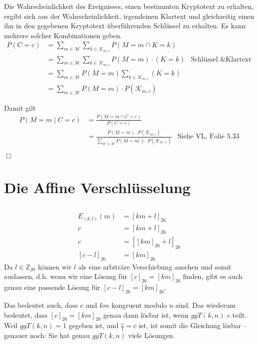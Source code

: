 \documentclass{../crypto}
\begin{document}
Die Wahrscheinlichkeit des Ereignisses, einen bestimmten Kryptotext zu erhalten,
ergibt sich aus der Wahrscheinlichkeit, irgendeinen Klartext und gleichzeitig
einen ihn in den gegebenen Kryptotext überführenden Schlüssel zu erhalten. Es
kann mehrere solcher Kombinationen geben.
\begin{align*}
   P(C=c) &= \sum\limits_{m\in\mathcal{M}} \sum\limits_{k\in\mathcal{K}_{m,c}}P(M=m \cap K=k) \\
          &= \sum\limits_{m\in\mathcal{M}} \sum\limits_{k\in\mathcal{K}_{m,c}}P(M=m)\cdot(K=k) & \text{Schlüssel \& Klartext unabhängig} \\
          &= \sum\limits_{m\in\mathcal{M}} P(M=m) \sum\limits_{k\in\mathcal{K}_{m,c}}(K=k) \\
          &= \sum\limits_{m\in\mathcal{M}} P(M=m)\cdot P(\mathcal{K}_{m,c})
\end{align*}

Damit gilt 
\begin{align*}
   P(M=m \mid C=c) &= \frac{P(M=m \cap C=c)}{P(C=c)} \\
                   &= \frac{P(M=m)\cdot
P(\mathcal{K}_{m,c})}{\sum_{m'\in\mathcal{M}} P(M=m')\cdot
P(\mathcal{K}_{m',c})} & \text{Siehe VL, Folie 5.33}
\end{align*}

\hfill$\Box$

\section{Die Affine Verschlüsselung}

\subsection{}

\begin{align*}
E_{(k,l)}(m)&=\left[km+l\right]_{26}\\
c&=\left[km+l\right]_{26}\\
c&=\left[\left[km\right]_{26} + l\right]_{26}\\
\left[c - l\right]_{26}&=\left[km\right]_{26}
\end{align*}
Da $l \in \mathbb{Z}_{26}$ können wir $l$ als eine arbiträre Verschiebung ansehen
und somit auslassen, d.h. wenn wir eine Lösung für $\left[c\right]_{26}=\left[km\right]_{26}$ finden, 
gibt es auch genau eine passende Lösung für $\left[c - l\right]_{26}=\left[km\right]_{26}$.

Das bedeutet auch, dass $c$ und $km$ kongruent modulo $n$ sind.
Das wiederum bedeutet, dass $\left[c\right]_{26}=\left[km\right]_{26}$ genau dann lösbar ist, wenn $ggT(k,n)$ $c$ teilt. Weil $ggT(k,n)=1$ gegeben ist, und $\frac{c}{1}=c$ ist, ist somit die Gleichung lösbar -- genauer noch: Sie hat genau $ggT(k,n)$ viele Lösungen.
\end{document}
